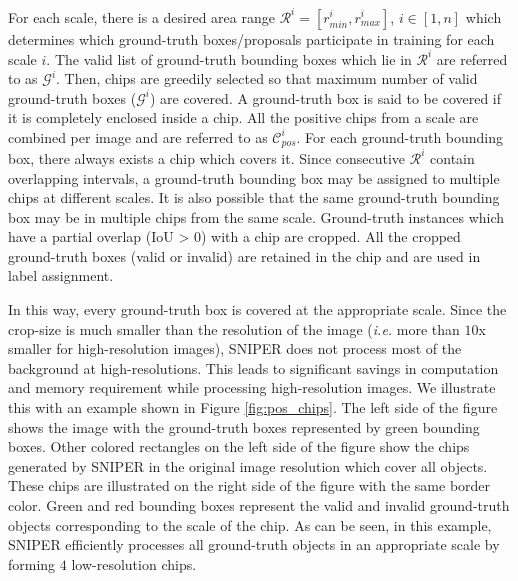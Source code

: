 \documentclass{article}
\begin{document}
For each scale, there is a desired area range $\mathcal{R}^i = [r_{min}^{i}, r_{max}^{i}]$, $i \in [1, n]$ which determines which ground-truth boxes/proposals participate in training for each scale $i$. The valid list of ground-truth bounding boxes which lie in $\mathcal{R}^i$ are referred to as $\mathcal{G}^i$. Then, chips are greedily selected so that maximum number of valid ground-truth boxes ($\mathcal{G}^i$) are covered. A ground-truth box is said to be covered if it is completely enclosed inside a chip. All the positive chips from a scale are combined per image and are referred to as $\mathcal{C}_{pos}^i$. For each ground-truth bounding box, there always exists a chip which covers it. Since consecutive $\mathcal{R}^i$ contain overlapping intervals, a ground-truth bounding box may be assigned to multiple chips at different scales. It is also possible that the same ground-truth bounding box may be in multiple chips from the same scale. Ground-truth instances which have a partial overlap (IoU > 0) with a chip are cropped. All the cropped ground-truth boxes (valid or invalid) are retained in the chip and are used in label assignment.


In this way, every ground-truth box is covered at the appropriate scale. Since the crop-size is much smaller than the resolution of the image (\textit{i.e.} more than $10$x smaller for high-resolution images), SNIPER does not process most of the background at high-resolutions. This leads to significant savings in computation and memory requirement while processing high-resolution images. We illustrate this with an example shown in Figure \ref{fig:pos_chips}. The left side of the figure shows the image with the ground-truth boxes represented by green bounding boxes. Other colored rectangles on the left side of the figure show the chips generated by SNIPER in the original image resolution which cover all objects. These chips are illustrated on the right side of the figure with the same border color. Green and red bounding boxes represent the valid and invalid ground-truth objects corresponding to the scale of the chip. As can be seen, in this example, SNIPER efficiently processes all ground-truth objects in an appropriate scale by forming $4$ low-resolution chips.
\end{document}
